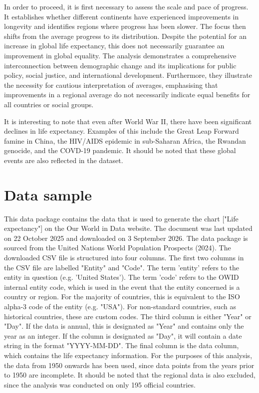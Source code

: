 \documentclass{article}
\begin{document}
In order to proceed, it is first necessary to assess the scale and pace of progress. It establishes whether different continents have experienced improvements in longevity and identifies regions where progress has been slower.
The focus then shifts from the average progress to its distribution. Despite the potential for an increase in global life expectancy, this does not necessarily guarantee an improvement in global equality. 
The analysis demonstrates a comprehensive interconnection between demographic change and its implications for public policy, social justice, and international development. Furthermore, they illustrate the necessity for cautious interpretation of averages, emphasising that improvements in a regional average do not necessarily indicate equal benefits for all countries or social groups.

It is interesting to note that even after World War II, there have been significant declines in life expectancy. Examples of this include the Great Leap Forward famine in China, the HIV/AIDS epidemic in sub-Saharan Africa, the Rwandan genocide, and the COVD-19 pandemic. It should be noted that these global events are also reflected in the dataset. 
\section*{Data sample}

This data package contains the data that is used to generate the chart ["Life expectancy"]\cite{Our2019Life} on the Our World in Data website. The document was last updated on 22 October 2025 and downloaded on 3 September 2026. The data package is sourced from the United Nations World Population Prospects (2024).
The downloaded CSV file is structured into four columns. 
The first two columns in the CSV file are labelled "Entity" and "Code". The term 'entity' refers to the entity in question (e.g. 'United States'). The term 'code' refers to the OWID internal entity code, which is used in the event that the entity concerned is a country or region. For the majority of countries, this is equivalent to the ISO alpha-3 code of the entity (e.g. "USA"). For non-standard countries, such as historical countries, these are custom codes.
The third column is either "Year" or "Day". If the data is annual, this is designated as "Year" and contains only the year as an integer. If the column is designated as "Day", it will contain a date string in the format "YYYY-MM-DD". The final column is the data column, which contains the life expectancy information. 
For the purposes of this analysis, the data from 1950 onwards has been used, since data points from the years prior to 1950 are incomplete. It should be noted that the regional data is also excluded, since the analysis was conducted on only 195 official countries. 
\end{document}
